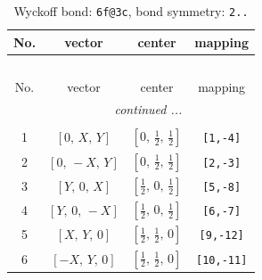 \documentclass[fleqn,8pt]{jsarticle}
\begin{document}
\begin{longtable}{cccc}
\caption{Wyckoff bond: {\tt 6f@3c}, bond symmetry: {\tt 2..}}
 \\
 \hline \hline
No. & vector & center & mapping \\ \hline \endfirsthead

\multicolumn{3}{l}{\tablename\ \thetable{}} \\
 \hline \hline
No. & vector & center & mapping \\ \hline \endhead

 \hline \hline
\multicolumn{3}{r}{\footnotesize\it continued ...} \\ \endfoot

 \hline \hline
\multicolumn{3}{r}{} \\ \endlastfoot

1 & $\left[ 0,\, X,\, Y \right]$ & $\left[ 0,\, \frac{1}{2},\, \frac{1}{2} \right]$ & {\tt [1,-4]} \\ \hline
2 & $\left[ 0,\, - X,\, Y \right]$ & $\left[ 0,\, \frac{1}{2},\, \frac{1}{2} \right]$ & {\tt [2,-3]} \\ \hline
3 & $\left[ Y,\, 0,\, X \right]$ & $\left[ \frac{1}{2},\, 0,\, \frac{1}{2} \right]$ & {\tt [5,-8]} \\ \hline
4 & $\left[ Y,\, 0,\, - X \right]$ & $\left[ \frac{1}{2},\, 0,\, \frac{1}{2} \right]$ & {\tt [6,-7]} \\ \hline
5 & $\left[ X,\, Y,\, 0 \right]$ & $\left[ \frac{1}{2},\, \frac{1}{2},\, 0 \right]$ & {\tt [9,-12]} \\ \hline
6 & $\left[ - X,\, Y,\, 0 \right]$ & $\left[ \frac{1}{2},\, \frac{1}{2},\, 0 \right]$ & {\tt [10,-11]} \\
\end{longtable}
\renewcommand{\arraystretch}{1.2}
\end{document}
